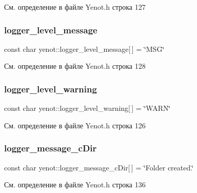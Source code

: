 См. определение в файле Yenot.\+h строка 127

\mbox{\label{namespaceyenot_a536380830aa21975126348216a729b08}} 
\subsubsection{\texorpdfstring{logger\+\_\+level\+\_\+message}{logger\_level\_message}}
{\footnotesize\ttfamily const char yenot\+::logger\+\_\+level\+\_\+message\mbox{[}$\,$\mbox{]} = \char`\"{}M\+SG\char`\"{}}



См. определение в файле Yenot.\+h строка 128

\mbox{\label{namespaceyenot_ab09d0dabe8840893fe9dc4a855ffc2fa}} 
\subsubsection{\texorpdfstring{logger\+\_\+level\+\_\+warning}{logger\_level\_warning}}
{\footnotesize\ttfamily const char yenot\+::logger\+\_\+level\+\_\+warning\mbox{[}$\,$\mbox{]} = \char`\"{}W\+A\+RN\char`\"{}}



См. определение в файле Yenot.\+h строка 126

\mbox{\label{namespaceyenot_a674d34d95501a1071db0ac7b39c64f57}} 
\subsubsection{\texorpdfstring{logger\+\_\+message\+\_\+c\+Dir}{logger\_message\_cDir}}
{\footnotesize\ttfamily const char yenot\+::logger\+\_\+message\+\_\+c\+Dir\mbox{[}$\,$\mbox{]} = \char`\"{}Folder created.\char`\"{}}



См. определение в файле Yenot.\+h строка 136

